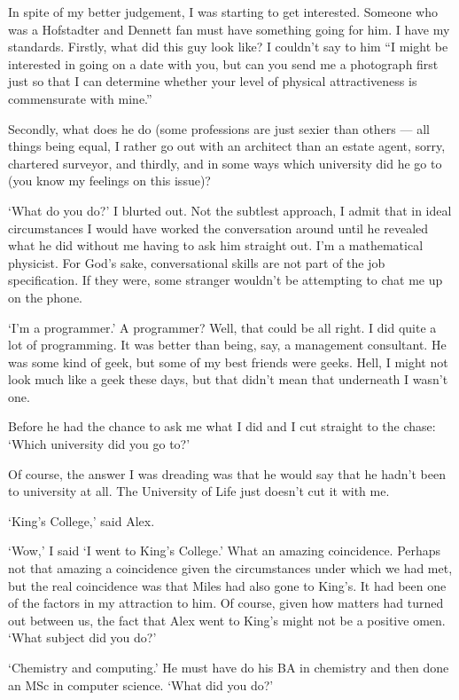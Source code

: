 In spite of my better judgement, I was starting to get interested.
Someone who was a Hofstadter and Dennett fan must have something
going for him. I have my standards. Firstly, what did this guy look
like? I couldn't say to him ``I might be interested in going on a
date with you, but can you send me a photograph first just so that I
can determine whether your level of physical attractiveness is
commensurate with mine.''

Secondly, what does he do (some professions are just sexier than
others --- all things being equal, I rather go out with an architect
than an estate agent, sorry, chartered surveyor, and thirdly, and in
some ways which university did he go to (you know my feelings on
this issue)?

`What do you do?' I blurted out. Not the subtlest approach, I admit
that in ideal circumstances I would have worked the conversation
around until he revealed what he did without me having to ask him
straight out. I'm a mathematical physicist. For God's sake,
conversational skills are not part of the job specification. If they
were, some stranger wouldn't be attempting to chat me up on the
phone.

`I'm a programmer.' A programmer? Well, that could be all right. I
did quite a lot of programming. It was better than being, say, a
management consultant. He was some kind of geek, but some of my best
friends were geeks. Hell, I might not look much like a geek these
days, but that didn't mean that underneath I wasn't one.

Before he had the chance to ask me what I did and I cut straight to
the chase: `Which university did you go to?'

Of course, the answer I was dreading was that he would say that he
hadn't been to university at all. The University of Life just
doesn't cut it with me.

`King's College,' said Alex.

`Wow,' I said `I went to King's College.' What an amazing
coincidence. Perhaps not that amazing a coincidence given the
circumstances under which we had met, but the real coincidence was
that Miles had also gone to King's. It had been one of the factors
in my attraction to him. Of course, given how matters had turned out
between us, the fact that Alex went to King's might not be a
positive omen. `What subject did you do?'

`Chemistry and computing.' He must have do his BA in chemistry and
then done an MSc in computer science. `What did you do?'

